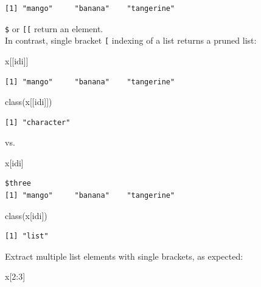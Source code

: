 \documentclass[
]{book}
\newenvironment{Shaded}{\begin{snugshade}}{\end{snugshade}}
\newcommand{\DecValTok}[1]{\textcolor[rgb]{0.00,0.00,0.81}{#1}}
\newcommand{\FunctionTok}[1]{\textcolor[rgb]{0.00,0.00,0.00}{#1}}
\newcommand{\NormalTok}[1]{#1}
\newcommand{\SpecialCharTok}[1]{\textcolor[rgb]{0.00,0.00,0.00}{#1}}
\begin{document}
\begin{verbatim}
[1] "mango"     "banana"    "tangerine"
\end{verbatim}

\texttt{\$} or \texttt{{[}{[}} return an element.\\
In contrast, single bracket \texttt{{[}} indexing of a list returns a pruned list:

\begin{Shaded}
\begin{Highlighting}[]
\NormalTok{x[[idi]]}
\end{Highlighting}
\end{Shaded}

\begin{verbatim}
[1] "mango"     "banana"    "tangerine"
\end{verbatim}

\begin{Shaded}
\begin{Highlighting}[]
\FunctionTok{class}\NormalTok{(x[[idi]])}
\end{Highlighting}
\end{Shaded}

\begin{verbatim}
[1] "character"
\end{verbatim}

vs.

\begin{Shaded}
\begin{Highlighting}[]
\NormalTok{x[idi]}
\end{Highlighting}
\end{Shaded}

\begin{verbatim}
$three
[1] "mango"     "banana"    "tangerine"
\end{verbatim}

\begin{Shaded}
\begin{Highlighting}[]
\FunctionTok{class}\NormalTok{(x[idi])}
\end{Highlighting}
\end{Shaded}

\begin{verbatim}
[1] "list"
\end{verbatim}

Extract multiple list elements with single brackets, as expected:

\begin{Shaded}
\begin{Highlighting}[]
\NormalTok{x[}\DecValTok{2}\SpecialCharTok{:}\DecValTok{3}\NormalTok{]}
\end{Highlighting}
\end{Shaded}
\end{document}
